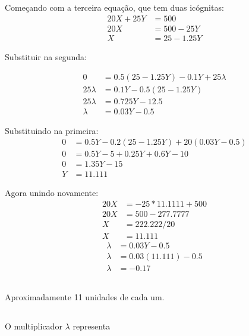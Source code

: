 \documentclass{article}
\begin{document}
\subsection{}

Começando com a terceira equação, que tem duas icógnitas:
\[
	\begin{aligned}
		20X + 25Y & = 500        \\
		20X       & = 500 - 25Y  \\
		X         & = 25 - 1.25Y
	\end{aligned}
\]

Substituir na segunda:

\[
	\begin{aligned}
		0         & = 0.5(25 - 1.25Y) - 0.1Y + 25\lambda \\
		25\lambda & = 0.1Y - 0.5(25 - 1.25Y)             \\
		25\lambda & = 0.725Y - 12.5                      \\
		\lambda   & = 0.03Y - 0.5
	\end{aligned}
\]

Substituindo na primeira:
\[
	\begin{aligned}
		0 & = 0.5Y - 0.2(25 -1.25Y) + 20(0.03Y - 0.5) \\
		0 & = 0.5Y - 5 + 0.25Y + 0.6Y - 10            \\
		0 & = 1.35Y - 15                              \\
		Y & = 11.111
	\end{aligned}
\]

Agora unindo novamente:
\[
	\begin{aligned}
		20X & = -25 * 11.1111 + 500 \\
		20X & = 500 - 277.7777      \\
		X   & = 222.222/20          \\
		X   & = 11.111
	\end{aligned}
\]
\[
	\begin{aligned}
		\lambda & = 0.03Y - 0.5        \\
		\lambda & = 0.03(11.111) - 0.5 \\
		\lambda & = -0.17
	\end{aligned}
\]

\subsection{}
Aproximadamente 11 unidades de cada um.

\subsection{}
O multiplicador \(\lambda\) representa
\end{document}
